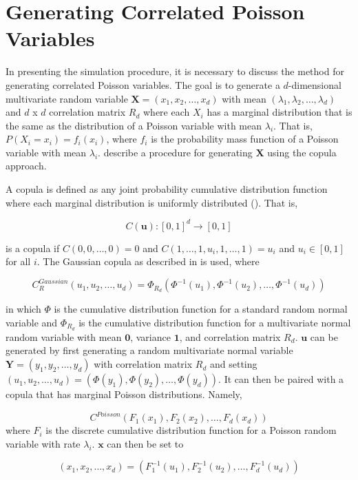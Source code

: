 \section{Generating Correlated Poisson Variables}\label{ch:generate_correlated_poisson}
In presenting the simulation procedure, it is necessary to discuss the method for generating correlated Poisson variables. The goal is to generate a $d$-dimensional multivariate random variable $\boldsymbol{X} = (x_1, x_2, \ldots, x_d)$ with mean $(\lambda_1, \lambda_2, \ldots, \lambda_{d})$ and $d$ x $d$ correlation matrix $R_d$ where each $X_i$ has a marginal distribution that is the same as the distribution of a Poisson variable with mean $\lambda_i$. That is, $P(X_i = x_i) = f_i(x_i)$, where $f_i$ is the probability mass function of a Poisson variable with mean $\lambda_i$. \cite{A8} describe a procedure for generating $\boldsymbol{X}$ using the copula approach. 

A copula is defined as any joint probability cumulative distribution function where each marginal distribution is uniformly distributed (\cite{B1}). That is, 

$$C(\boldsymbol{u}): [0,1]^d \to [0,1]$$ 

is a copula if $C(0, 0, \ldots, 0) = 0$ and $C(1, \ldots, 1, u_i, 1, \ldots, 1) = u_i$ and $u_i \in [0,1]$ for all $i$. The Gaussian copula as described in \cite{A8} is used, where

$$ C_R^{Gaussian}(u_1, u_2, \ldots, u_d) = \Phi_{R_d}(\Phi^{-1}(u_1), \Phi^{-1}(u_2), \ldots,  \Phi^{-1}(u_d))$$

in which $\Phi$ is the cumulative distribution function for a standard random normal variable and $\Phi_{R_d}$ is the cumulative distribution function for a multivariate normal random variable with mean $\boldsymbol{0}$, variance $\boldsymbol{1}$, and correlation matrix $R_d$. $\boldsymbol{u}$ can be generated by first generating a random multivariate normal variable $\boldsymbol{Y} = (y_1,y_2, \ldots, y_d)$ with correlation matrix $R_d$ and setting $(u_1, u_2, \ldots, u_d) = (\Phi(y_1), \Phi(y_2), \ldots,  \Phi(y_d))$. It can then be paired with a copula that has marginal Poisson distributions. Namely,

$$ C^{Poisson}(F_1(x_1), F_2(x_2), \ldots, F_d(x_d))$$ where $F_i$ is the discrete cumulative distribution function for a Poisson random variable with rate $\lambda_i$. $\boldsymbol{x}$ can then be set to

$$(x_1, x_2, \ldots, x_d) = (F^{-1}_1(u_1), F^{-1}_2(u_2), \ldots, F^{-1}_d(u_d))$$

